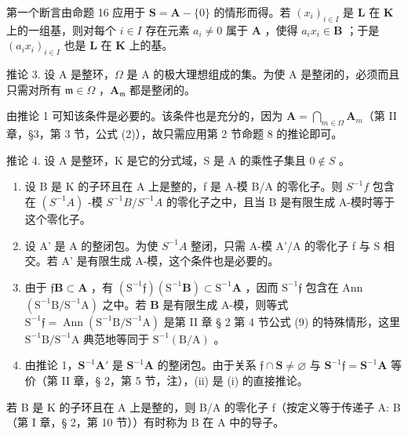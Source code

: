 第一个断言由命题 16 应用于 \(\mathbf{S} = \mathbf{A} - \{0\}\) 的情形而得。若 \((x_{i})_{i\in I}\) 是 \(\mathbf{L}\) 在 \(\mathbf{K}\) 上的一组基，则对每个 \(i\in I\) 存在元素 \(a_{i}\neq 0\) 属于 \(\mathbf{A}\) ，使得 \(a_{i}x_{i}\in \mathbf{B}\) ；于是 \((a_{i}x_{i})_{i\in I}\) 也是 \(\mathbf{L}\) 在 \(\mathbf{K}\) 上的基。

推论 3. 设 A 是整环，\(\Omega\) 是 A 的极大理想组成的集。为使 A 是整闭的，必须而且只需对所有 \(\mathfrak{m} \in \Omega\) ，\(\mathbf{A}_{\mathfrak{m}}\) 都是整闭的。

由推论 1 可知该条件是必要的。该条件也是充分的，因为 \(\mathbf{A} = \bigcap_{m \in \Omega} \mathbf{A}_m\)（第 II 章，§3，第 3 节，公式 (2)），故只需应用第 2 节命题 8 的推论即可。

推论 4. 设 A 是整环，K 是它的分式域，S 是 A 的乘性子集且 \(0 \notin S\) 。

\begin{enumerate}
\def\labelenumi{(\roman{enumi})}
\item
  设 B 是 K 的子环且在 A 上是整的，f 是 A-模 B/A 的零化子。则 \(S^{-1}f\) 包含在 \((S^{-1}A)\) -模 \(S^{-1}B/S^{-1}A\) 的零化子之中，且当 B 是有限生成 A-模时等于这个零化子。
\item
  设 A' 是 A 的整闭包。为使 \(S^{-1}A\) 整闭，只需 A-模 A'/A 的零化子 f 与 S 相交。若 A' 是有限生成 A-模，这个条件也是必要的。
\setcounter{enumi}{0}
\item
  由于 \(\mathfrak{f}\mathbf{B} \subset \mathbf{A}\) ，有 \((\mathrm{S}^{-1}\mathfrak{f})(\mathrm{S}^{-1}\mathbf{B}) \subset \mathrm{S}^{-1}\mathbf{A}\) ，因而 \(\mathrm{S}^{-1}\mathfrak{f}\) 包含在 Ann \((\mathrm{S}^{-1}\mathrm{B} / \mathrm{S}^{-1}\mathrm{A})\) 之中。若 \(\mathbf{B}\) 是有限生成 A-模，则等式 \(\mathrm{S}^{-1}\mathfrak{f} = \operatorname{Ann}(\mathrm{S}^{-1}\mathrm{B} / \mathrm{S}^{-1}\mathrm{A})\) 是第 II 章 § 2 第 4 节公式 (9) 的特殊情形，这里 \(\mathrm{S}^{-1}\mathrm{B} / \mathrm{S}^{-1}\mathrm{A}\) 典范地等同于 \(\mathrm{S}^{-1}(\mathrm{B} / \mathrm{A})\) 。
\item
  由推论 1，\(\mathbf{S}^{-1}\mathbf{A}'\) 是 \(\mathbf{S}^{-1}\mathbf{A}\) 的整闭包。由于关系 \(\mathfrak{f} \cap \mathbf{S} \neq \varnothing\) 与 \(\mathbf{S}^{-1}\mathfrak{f} = \mathbf{S}^{-1}\mathbf{A}\) 等价（第 II 章，§ 2，第 5 节，注），(ii) 是 (i) 的直接推论。
\end{enumerate}

若 B 是 K 的子环且在 A 上是整的，则 B/A 的零化子 f（按定义等于传递子 A: B（第 I 章，§ 2，第 10 节））有时称为 B 在 A 中的导子。

